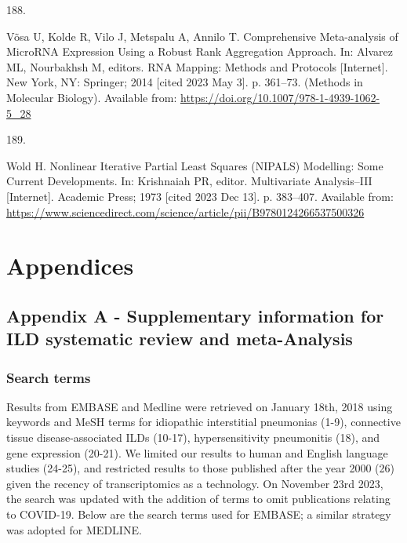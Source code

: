 \documentclass[
]{article}
\newlength{\cslhangindent}
\newlength{\csllabelwidth}
\newenvironment{CSLReferences}[2] %
 {\begin{list}{}{%
  \setlength{\itemindent}{0pt}
  \setlength{\leftmargin}{0pt}
  \setlength{\parsep}{0pt}
  \ifodd #1
   \setlength{\leftmargin}{\cslhangindent}
   \setlength{\itemindent}{-1\cslhangindent}
  \fi
  \setlength{\itemsep}{#2\baselineskip}}}
 {\end{list}}
\newcommand{\CSLLeftMargin}[1]{\parbox[t]{\csllabelwidth}{\strut#1\strut}}
\newcommand{\CSLRightInline}[1]{\parbox[t]{\linewidth - \csllabelwidth}{\strut#1\strut}}
\begin{document}
\begin{CSLReferences}{0}{1}
\CSLLeftMargin{188. }%
\CSLRightInline{Võsa U, Kolde R, Vilo J, Metspalu A, Annilo T. Comprehensive {Meta}-analysis of {MicroRNA} {Expression} {Using} a {Robust} {Rank} {Aggregation} {Approach}. In: Alvarez ML, Nourbakhsh M, editors. {RNA} {Mapping}: {Methods} and {Protocols} {[}Internet{]}. New York, NY: Springer; 2014 {[}cited 2023 May 3{]}. p. 361--73. (Methods in {Molecular} {Biology}). Available from: \url{https://doi.org/10.1007/978-1-4939-1062-5_28}}

\CSLLeftMargin{189. }%
\CSLRightInline{Wold H. Nonlinear {Iterative} {Partial} {Least} {Squares} ({NIPALS}) {Modelling}: {Some} {Current} {Developments}. In: Krishnaiah PR, editor. Multivariate {Analysis}--{III} {[}Internet{]}. Academic Press; 1973 {[}cited 2023 Dec 13{]}. p. 383--407. Available from: \url{https://www.sciencedirect.com/science/article/pii/B9780124266537500326}}

\end{CSLReferences}

\clearpage

\setlength{\parindent}{4em} 
\linespread{1}
\doublespacing

\section*{Appendices}

\setcounter{secnumdepth}{0}

\subsection{Appendix A - Supplementary information for ILD systematic review and meta-Analysis}\label{appendix-a---supplementary-information-for-ild-systematic-review-and-meta-analysis}

\renewcommand{\thefigure}{A2.\arabic{figure}}
\setcounter{figure}{0}
\renewcommand{\thetable}{A2.\arabic{table}}
\setcounter{table}{0}
\renewcommand{\theequation}{A2.\arabic{equation}}
\setcounter{equation}{0}

\subsubsection{Search terms}\label{search-terms}

Results from EMBASE and Medline were retrieved on January 18th, 2018 using keywords and MeSH terms for idiopathic interstitial pneumonias (1-9), connective tissue disease-associated ILDs (10-17), hypersensitivity pneumonitis (18), and gene expression (20-21). We limited our results to human and English language studies (24-25), and restricted results to those published after the year 2000 (26) given the recency of transcriptomics as a technology. On November 23rd 2023, the search was updated with the addition of terms to omit publications relating to COVID-19. Below are the search terms used for EMBASE; a similar strategy was adopted for MEDLINE.
\end{document}

